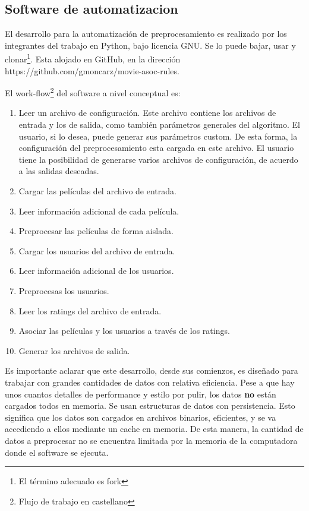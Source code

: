 \documentclass[journal]{IEEEtran}
\begin{document}
\subsection{Software de automatizacion}
El desarrollo para la automatización de preprocesamiento es realizado por 
los integrantes del trabajo en Python, bajo licencia GNU. Se lo puede bajar,
usar y clonar\footnote{El término adecuado es fork}. Esta alojado en GitHub, en la 
dirección https://github.com/gmoncarz/movie-asoc-rules. 

El work-flow\footnote{Flujo de trabajo en castellano} del software a nivel conceptual es:
\begin{enumerate}
\item Leer un archivo de configuración. Este archivo 
contiene los archivos de entrada y los de salida,
como también parámetros generales del algoritmo.
El usuario, si lo desea, puede generar sus parámetros custom. De
esta forma, la configuración del preprocesamiento esta cargada en este
archivo. El usuario tiene la posibilidad de generarse varios archivos
de configuración, de acuerdo a las salidas deseadas.
\item Cargar las películas del archivo de entrada.
\item Leer información adicional de cada película.
\item Preprocesar las películas de forma aislada.
\item Cargar los usuarios del archivo de entrada.
\item Leer información adicional de los usuarios.
\item Preprocesas los usuarios.
\item Leer los ratings del archivo de entrada.
\item Asociar las películas y los usuarios a través de los ratings.
\item Generar los archivos de salida.
\end{enumerate}

Es importante aclarar que este desarrollo, desde sus comienzos,
es diseñado para trabajar con grandes cantidades de datos con relativa
eficiencia. Pese a que hay unos cuantos detalles de performance 
y estilo por pulir,
los datos \textbf{no} están cargados todos en memoria. Se usan estructuras
de datos con persistencia. Esto significa que los datos son cargados en
archivos binarios, eficientes, y se va accediendo a ellos mediante
un cache en memoria. De esta manera, la cantidad de datos a preprocesar
no se encuentra limitada por la memoria de la computadora donde
el software se ejecuta.
\end{document}

